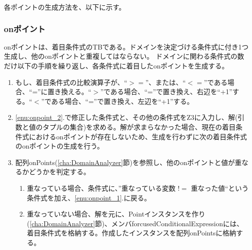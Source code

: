 \documentclass[uplatex, report, a4j, 10pt]{jsbook}
\begin{document}
各ポイントの生成方法を、以下に示す。

\subsubsection{onポイント}
onポイントは、着目条件式のTBである。ドメインを決定づける条件式に付き1つ生成し、他のonポイントと重複してはならない。
ドメインに関わる条件式の数だけ以下の手順を繰り返し、各条件式に着目したonポイントを生成する。
\begin{enumerate}
  \item\label{enu:onpoint_2} もし、着目条件式の比較演算子が、“$>=$”、または、“$<=$”である場合、“=”に置き換える。“$>$”である場合、“=”で置き換え、右辺を“+1”する。“$<$”である場合、“=”で置き換え、左辺を“+1”する。
  \item\label{enu:onpoint_1} \ref{enu:onpoint_2}.で修正した条件式と、その他の条件式をZ3に入力し、解(引数と値のタプルの集合)を求める。解が求まらなかった場合、現在の着目条件式におけるonポイントが存在しないため、生成を行わずに次の着目条件式のonポイントの生成を行う。
  \item 配列onPoints(\ref{cha:DomainAnalyzer}節)を参照し、他のonポイントと値が重なるかどうかを判定する。
        \begin{enumerate}
          \item 重なっている場合、条件式に、”重なっている変数 $!=$ 重なった値“という条件式を加え、\ref{enu:onpoint_1}.に戻る。
          \item 重なっていない場合、解を元に、Pointインスタンスを作り(\ref{cha:DomainAnalyzer}節)、メンバforcusedConditionalExpressionには、着目条件式を格納する。作成したインスタンスを配列onPointsに格納する。
        \end{enumerate}
\end{enumerate}
\end{document}
